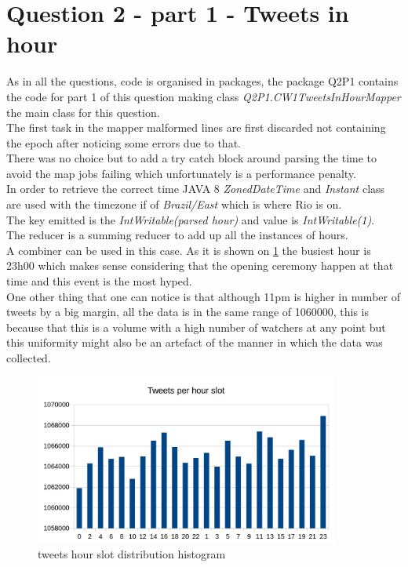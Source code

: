 \documentclass[12pt]{article}
\begin{document}
\section{Question 2 - part 1 - Tweets in hour}

As in all the questions, code is organised in packages, the package Q2P1
contains the code for part 1 of this question making class \emph{Q2P1.CW1TweetsInHourMapper} the main class for this question. \\

The first task in the mapper malformed lines are first discarded not containing the epoch after noticing some errors due to that. \\ 
There was no choice but to add a try catch block around parsing the time to avoid the map jobs failing which unfortunately is a performance penalty. \\
In order to retrieve the correct time JAVA 8 \emph{ZonedDateTime} and \emph{Instant} class are used with the timezone if of \emph{Brazil/East} which is where Rio is on. \\
The key emitted is the \emph{IntWritable(parsed hour)} and value is \emph{IntWritable(1)}.\\
The reducer is a summing reducer to add up all the instances of hours. \\ A combiner can be used in this case.
As it is shown on \ref{fig:tweets_time} the busiest hour is 23h00 which makes sense considering that the opening ceremony happen at that time and this event is the most hyped. \\
One other thing that one can notice is that although 11pm is 
higher in number of tweets by a big margin, all the data is in the same range of  1060000, this is because that this is a volume with a high number of watchers at any point but this uniformity might also be an artefact of the manner in which the data was collected. \\

\begin{figure}
	\centering
	\caption{tweets hour slot distribution histogram}
	\label{fig:tweets_time}
	\includegraphics[width=10cm]{tweets_hour_slot}
\end{figure}
\end{document}
